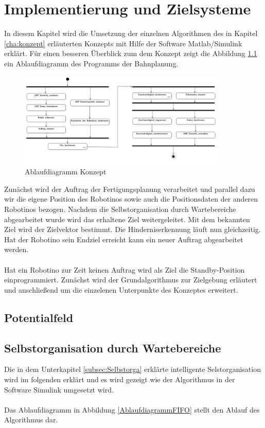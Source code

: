 \chapter{Implementierung und Zielsysteme}
\label{cha:Implementierung}
In diesem Kapitel wird die Umsetzung der einzelnen Algorithmen des in Kapitel \ref{cha:konzept} erläuterten Konzepts mit Hilfe der Software Matlab/Simulink erklärt.
Für einen besseren Überblick zum dem Konzept zeigt die Abbildung \ref{Ablaufdiagramm} ein Ablaufdiagramm des Programms der Bahnplanung.\\

\begin{figure}[H]
	\centering
	\includegraphics[width=0.9\textwidth]{Bilder/Bahnplanung.png}
	\caption{Ablaufdiagramm Konzept}
	\label{Ablaufdiagramm}
\end{figure}
\noindent
Zunächst wird der Auftrag der Fertigungsplanung verarbeitet und parallel dazu wir die eigene Position des Robotinos sowie auch die Positionsdaten der anderen Robotinos bezogen. Nachdem die Selbstorganisation durch Wartebereiche abgearbeitet wurde wird das erhaltene Ziel weitergeleitet. Mit dem bekannten Ziel wird der Zielvektor bestimmt. Die Hinderniserkennung läuft nun gleichzeitig.
Hat der Robotino sein Endziel erreicht kann ein neuer Auftrag abgearbeitet werden.\\
\\Hat ein Robotino zur Zeit keinen Auftrag wird als Ziel die Standby-Position einprogrammiert. Zunächst wird der Grundalgorithmus zur Zielgebung erläutert und anschließend um die einzelenen Unterpunkte des Konzeptes erweitert.\\

\section{Potentialfeld}
\label{sec:potentialfeld}

\section{Selbstorganisation durch Wartebereiche}
\label{sec:Impl:Selbstorga}
Die in dem Unterkapitel \ref{subsec:Selbstorga} erklärte intelligente Selstorganisation wird im folgenden erklärt und es wird gezeigt wie der Algorithmus in der Software Simulink umgesetzt wird. \\
\\
Das Ablaufdiagramm in Abbildung \ref{AblaufdiagrammFIFO} stellt den Ablauf des  Algorithmus dar.\\

